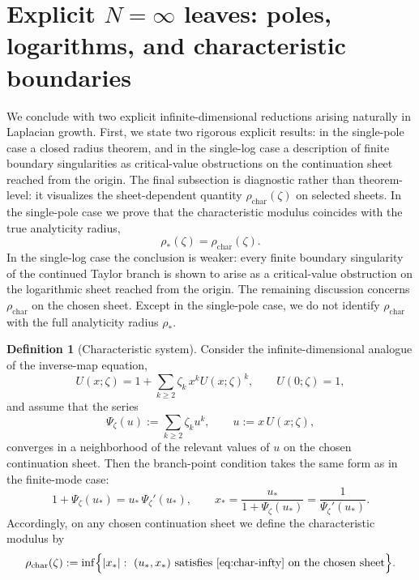\documentclass[11pt]{amsart}
\numberwithin{equation}{section}
\theoremstyle{plain}
\theoremstyle{definition}
\newtheorem{definition}[theorem]{Definition}
\theoremstyle{remark}
\begin{document}
\section{Explicit \texorpdfstring{\(N=\infty\)}{N=infinity} leaves: poles, logarithms, and characteristic boundaries}
\label{sec:infty-explicit-leaves}


We conclude with two explicit infinite-dimensional reductions arising naturally in
Laplacian growth. First, we state two
rigorous explicit results: in the single-pole case a closed radius theorem, and
in the single-log case a description of finite boundary singularities as
critical-value obstructions on the continuation sheet reached from the origin.
The final subsection is diagnostic rather than theorem-level: it visualizes the
sheet-dependent quantity \(\rho_{\mathrm{char}}(\zeta)\) on selected sheets. In the single-pole case we prove that the characteristic modulus coincides with
the true analyticity radius,
\[
\rho_*(\zeta)=\rho_{\mathrm{char}}(\zeta).
\]
In the single-log case the conclusion is weaker: every finite boundary
singularity of the continued Taylor branch is shown to arise as a critical-value
obstruction on the logarithmic sheet reached from the origin. The remaining
discussion concerns \(\rho_{\mathrm{char}}\) on the chosen sheet. Except in the
single-pole case, we do not identify \(\rho_{\mathrm{char}}\) with the full
analyticity radius \(\rho_*\).

\begin{definition}[Characteristic system]\label{def:char-infty-system}
Consider the infinite-dimensional analogue of the inverse-map equation,
\begin{equation}\label{eq:inv-eq-infty}
U(x;\zeta)=1+\sum_{k\ge2}\zeta_k\,x^k U(x;\zeta)^k,
\qquad U(0;\zeta)=1,
\end{equation}
and assume that the series
\begin{equation}\label{eq:Psi-infty}
\Psi_\zeta(u):=\sum_{k\ge2}\zeta_k u^k,
\qquad
u:=x\,U(x;\zeta),
\end{equation}
converges in a neighborhood of the relevant values of \(u\) on the chosen
continuation sheet. Then the branch-point condition takes the same form as in the finite-mode case:
\begin{equation}\label{eq:char-infty}
1+\Psi_\zeta(u_*)=u_*\,\Psi_\zeta'(u_*),
\qquad
x_* =\frac{u_*}{1+\Psi_\zeta(u_*)}
=\frac{1}{\Psi_\zeta'(u_*)}.
\end{equation}
Accordingly, on any chosen continuation sheet we define the characteristic modulus by
\begin{equation}\label{eq:rho-char-infty}
\rho_{\mathrm{char}}(\zeta)
:=
\inf\Bigl\{|x_*|:\ (u_*,x_*) \text{ satisfies \eqref{eq:char-infty} on the chosen sheet}\Bigr\}.
\end{equation}
\end{definition}
\end{document}
